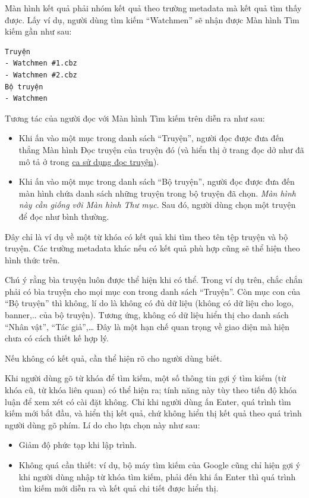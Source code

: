 Màn hình kết quả phải nhóm kết quả theo trường metadata mà kết quả tìm
thấy được. Lấy ví dụ, người dùng tìm kiếm ``Watchmen'' sẽ nhận được Màn
hình Tìm kiếm gần như sau:

\begin{verbatim}
Truyện
- Watchmen #1.cbz
- Watchmen #2.cbz
Bộ truyện
- Watchmen
\end{verbatim}

Tương tác của người đọc với Màn hình Tìm kiếm trên diễn ra như sau:

\begin{itemize}
  
  \item
        Khi ấn vào một mục trong danh sách ``Truyện'', người đọc được đưa đến
        thẳng Màn hình Đọc truyện của truyện đó (và hiển thị ở trang đọc dở
        như đã mô tả ở trong \protect\hyperlink{P3.3.3-read-comic}{ca sử dụng
          đọc truyện}).
  \item
        Khi ấn vào một mục trong danh sách ``Bộ truyện'', người đọc được đưa
        đến màn hình chứa danh sách những truyện trong bộ truyện đã chọn.
        \emph{Màn hình này cần giống với Màn hình Thư mục}. Sau đó, người dùng
        chọn một truyện để đọc như bình thường.
\end{itemize}

Đây chỉ là ví dụ về một từ khóa có kết quả khi tìm theo tên tệp truyện
và bộ truyện. Các trường metadata khác nếu có kết quả phù hợp cũng sẽ
thể hiện theo hình thức trên.

Chú ý rằng bìa truyện luôn được thể hiện khi có thể. Trong ví dụ trên,
chắc chắn phải có bìa truyện cho mọi mục con trong danh sách ``Truyện''.
Còn mục con của ``Bộ truyện'' thì không, lí do là không có đủ dữ liệu
(không có dữ liệu cho logo, banner,.. của bộ truyện). Tương ứng, không
có dữ liệu hiển thị cho danh sách ``Nhân vật'', ``Tác giả'',\ldots{} Đây
là một hạn chế quan trọng về giao diện mà hiện chưa có cách thiết kế hợp
lý.

Nếu không có kết quả, cần thể hiện rõ cho người dùng biết.

Khi người dùng gõ từ khóa để tìm kiếm, một số thông tin gợi ý tìm kiếm
(từ khóa cũ, từ khóa liên quan) có thể hiện ra; tính năng này tùy theo
tiến độ khóa luận để xem xét có cài đặt không. Chỉ khi người dùng ấn
Enter, quá trình tìm kiếm mới bắt đầu, và hiển thị kết quả, chứ không
hiển thị kết quả theo quá trình người dùng gõ phím. Lí do cho lựa chọn
này như sau:

\begin{itemize}
  
  \item
        Giảm độ phức tạp khi lập trình.
  \item
        Không quá cần thiết: ví dụ, bộ máy tìm kiếm của Google cũng chỉ hiện
        gợi ý khi người dùng nhập từ khóa tìm kiếm, phải đến khi ấn Enter thì
        quá trình tìm kiếm mới diễn ra và kết quả chi tiết được hiển thị.
\end{itemize}


